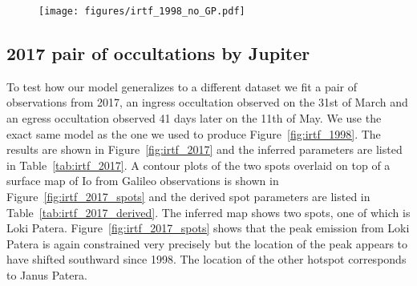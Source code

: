\documentclass[linenumbers,modern]{aastex62}
\begin{document}
\begin{figure}[t!]
    \begin{centering}
    \texttt{[image: figures/irtf\_1998\_no\_GP.pdf]}
    \end{centering}
\end{figure}


\subsection{2017 pair of occultations by Jupiter}
To test how our model generalizes to a different dataset we fit a pair of observations from 2017, an ingress occultation observed on the 31st of March and an egress occultation observed 41 days later on the 11th of May.
We use the exact same model as the one we used to produce Figure~\ref{fig:irtf_1998}.
The results are shown in Figure~\ref{fig:irtf_2017} and the inferred parameters are listed in Table~\ref{tab:irtf_2017}.
A contour plots of the two spots overlaid on top of a surface map of Io from Galileo observations is shown in Figure~\ref{fig:irtf_2017_spots} and the derived spot parameters are listed in Table~\ref{tab:irtf_2017_derived}.
The inferred map shows two spots, one of which is Loki Patera. 
Figure~\ref{fig:irtf_2017_spots} shows that the peak emission from Loki Patera is again constrained very precisely but the location of the peak appears to have shifted southward since 1998.
The location of the other hotspot corresponds to Janus Patera.
\end{document}
